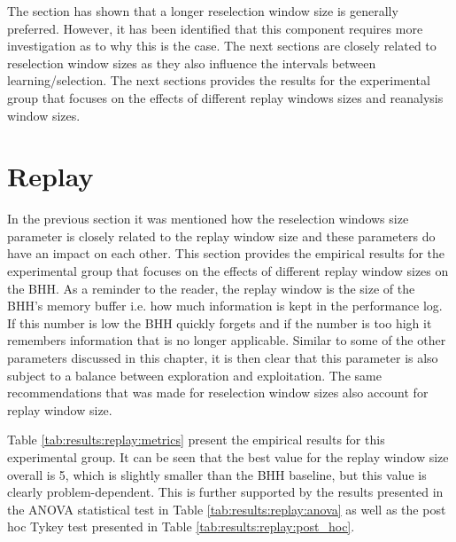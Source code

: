 The section has shown that a longer reselection window size is generally preferred. However, it has been identified that this component requires more investigation as to why this is the case. The next sections are closely related to reselection window sizes as they also influence the intervals between learning/selection. The next sections provides the results for the experimental group that focuses on the effects of different replay windows sizes and reanalysis window sizes.


\section{Replay}
\label{sec:results:replay}

In the previous section it was mentioned how the reselection windows size parameter is closely related to the replay window size and these parameters do have an impact on each other. This section provides the empirical results for the experimental group that focuses on the effects of different replay window sizes on the \Ac{BHH}. As a reminder to the reader, the replay window is the size of the \Ac{BHH}'s memory buffer i.e. how much information is kept in the performance log. If this number is low the \Ac{BHH} quickly forgets and if the number is too high it remembers information that is no longer applicable. Similar to some of the other parameters discussed in this chapter, it is then clear that this parameter is also subject to a balance between exploration and exploitation. The same recommendations that was made for reselection window sizes also account for replay window size.

Table \ref{tab:results:replay:metrics} present the empirical results for this experimental group. It can be seen that the best value for the replay window size overall is 5, which is slightly smaller than the \Ac{BHH} baseline, but this value is clearly problem-dependent. This is further supported by the results presented in the ANOVA statistical test in Table \ref{tab:results:replay:anova} as well as the post hoc Tykey test presented in Table \ref{tab:results:replay:post_hoc}. 

